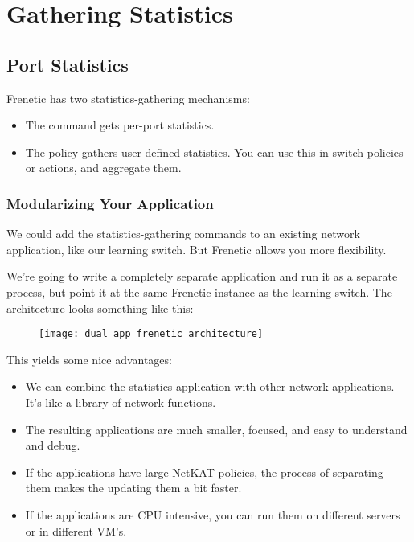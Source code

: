 
\chapter{Gathering Statistics}
\label{chapter:statistics}

\section{Port Statistics}

Frenetic has two statistics-gathering mechanisms:

\begin{itemize}
\item The  command gets per-port statistics.
\item The  policy gathers user-defined statistics.  You can use this in switch
policies or  actions, and aggregate them.
\end{itemize}

\subsection{Modularizing Your Application}

We could add the statistics-gathering commands to an existing network application, like our learning
switch.  But Frenetic allows you more flexibility.   

We're going to write a completely separate application and run it as a separate process, but point it
at the same Frenetic instance as the learning switch.  The architecture looks something like this:

\begin{figure}[h]
\centering
\texttt{[image: dual\_app\_frenetic\_architecture]}
\end{figure}

This yields some nice advantages:

\begin{itemize}
\item We can combine the statistics application with other network applications.  It's like a 
library of network functions.
\item The resulting applications are much smaller, focused, and easy to understand and debug.
\item If the applications have large NetKAT policies, the process of separating them makes the 
updating them a bit faster.
\item If the applications are CPU intensive, you can run them on different servers or in different VM's.
\end{itemize}

